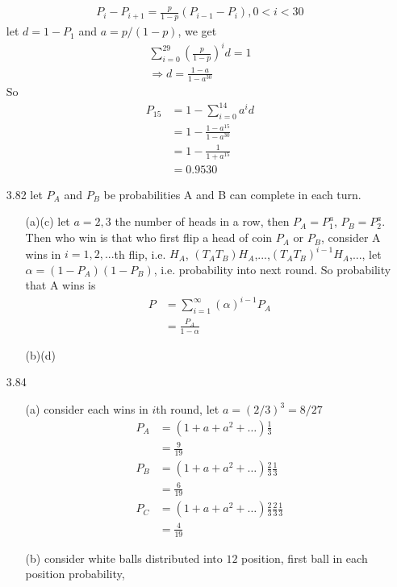 \documentclass[paper=a4, fontsize=11pt]{scrartcl} %
\numberwithin{equation}{section} %
\numberwithin{figure}{section} %
\numberwithin{table}{section} %
\begin{document}
\begin{itemize}
\begin{align}
		P_i - P_{i+1}  = \frac{p}{1-p} (P_{i-1} - P_i), 0<i<30
	\end{align}
	let $d = 1 - P_1$ and $a = p/(1-p)$, we get
	\begin{align}
		\sum_{i=0}^{29} \left(\frac{p}{1-p}\right)^i d  = 1 \\
		\Rightarrow d = \frac{1-a}{1-a^{30}}
	\end{align}
	So
	\begin{align}
		P_{15}  &= 1 - \sum_{i=0}^{14} a^i d \\
			&= 1 - \frac{1-a^{15}}{1-a^{30}}\\
			&= 1 - \frac{1}{1+a^{15}} \\
			&= 0.9530
	\end{align}
	\item[3.82] let $P_A$ and $P_B$ be probabilities A and B can complete in each turn.
	\begin{itemize}
		\item[(a)(c)] let $a=2,3$ the number of heads in a row, then $P_A = P_1^a$, $P_B=P_2^a$. Then who win is that who first flip a head of coin $P_A$ or $P_B$, consider A wins in $i=1,2,...$th flip, i.e. $H_A$, $(T_AT_B)H_A$,...,$(T_AT_B)^{i-1}H_A$,..., let $\alpha = (1-P_A)(1-P_B)$, i.e. probability into next round. So probability that A wins is
		\begin{align}
			P &= \sum_{i=1}^\infty (\alpha)^{i-1}P_A \\
				&= \frac{P_A}{1-\alpha}
		\end{align} 
		\item[(b)(d)]
	\end{itemize}
	\item[3.84]
	\begin{itemize}
		\item[(a)] consider each wins in $i$th round, let $a = (2/3)^3=8/27$
		\begin{align}
			P_A &= (1+a+a^2+\dots) \frac{1}{3}\\
			&= \frac{9}{19} \\
			P_B &= (1+a+a^2+\dots) \frac{2}{3}\frac{1}{3} \\
				&= \frac{6}{19} \\
			P_C &= (1+a+a^2+\dots) \frac{2}{3}\frac{2}{3}\frac{1}{3} \\
				&= \frac{4}{19}
		\end{align}
		\item[(b)] consider white balls distributed into $12$ position, first ball in each position probability,
		\begin{align}

\end{align}
\end{itemize}
\end{itemize}
\end{document}
